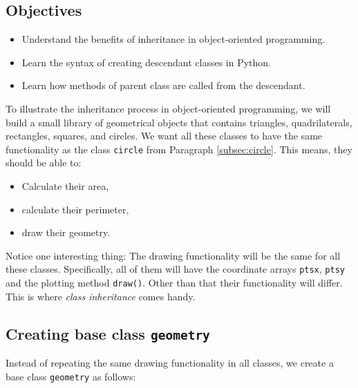 \documentclass[article,A4,12pt]{llncs}
\begin{document}
\subsection{Objectives}

\begin{itemize}
\item Understand the benefits of inheritance in object-oriented programming.
\item Learn the syntax of creating descendant classes in Python.
\item Learn how methods of parent class are called from the descendant. 
\end{itemize}
To illustrate the inheritance process in object-oriented programming, we will
build a small library of geometrical objects that contains 
triangles, quadrilaterals, rectangles, squares, and circles. 
We want all 
these classes to have the same functionality as the class {\tt circle} from 
Paragraph \ref{subsec:circle}. This means, they should be able to:
\begin{itemize}
\item Calculate their area,
\item calculate their perimeter,
\item draw their geometry.
\end{itemize}
Notice one interesting thing: The drawing functionality will be 
the same for all these classes. Specifically, all of them will have the coordinate 
arrays {\tt ptsx}, {\tt ptsy} and the plotting method {\tt draw()}. Other than 
that their functionality will differ. This is where {\em class inheritance} comes
handy.

\subsection{Creating base class {\tt geometry}}

Instead of repeating the same drawing functionality in all classes, we create 
a base class {\tt geometry} as follows:\\
\end{document}

